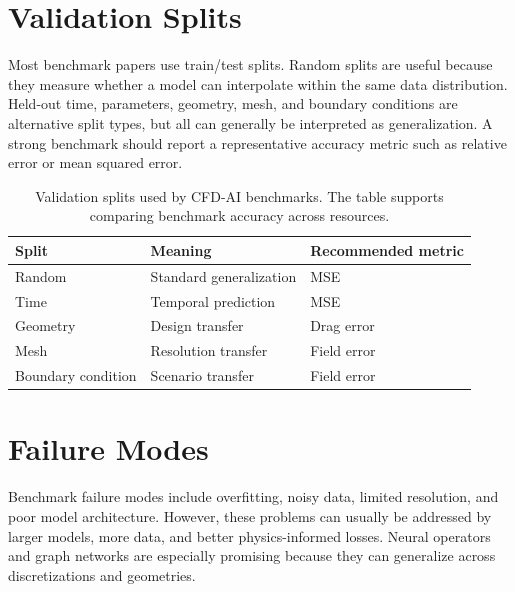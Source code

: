 \documentclass[11pt]{article}
\begin{document}
\section{Validation Splits}
Most benchmark papers use train/test splits. Random splits are useful because they measure whether a model can interpolate within the same data distribution. Held-out time, parameters, geometry, mesh, and boundary conditions are alternative split types, but all can generally be interpreted as generalization. A strong benchmark should report a representative accuracy metric such as relative error or mean squared error.

\begin{table}[h]
\centering
\begin{tabular}{lll}
\toprule
Split & Meaning & Recommended metric \\
\midrule
Random & Standard generalization & MSE \\
Time & Temporal prediction & MSE \\
Geometry & Design transfer & Drag error \\
Mesh & Resolution transfer & Field error \\
Boundary condition & Scenario transfer & Field error \\
\bottomrule
\end{tabular}
\caption{Validation splits used by CFD-AI benchmarks. The table supports comparing benchmark accuracy across resources.}
\end{table}

\section{Failure Modes}
Benchmark failure modes include overfitting, noisy data, limited resolution, and poor model architecture. However, these problems can usually be addressed by larger models, more data, and better physics-informed losses. Neural operators and graph networks are especially promising because they can generalize across discretizations and geometries.


\vspace{1em}
\end{document}
